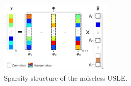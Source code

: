 \begin{figure}[!bh]
\centering
\includegraphics[width=0.5\textwidth]{images/Sparsity-Structure.png} %
\caption{Sparsity structure of the noiseless USLE.}
\label{fig:Sparsity-Structure}
\end{figure}